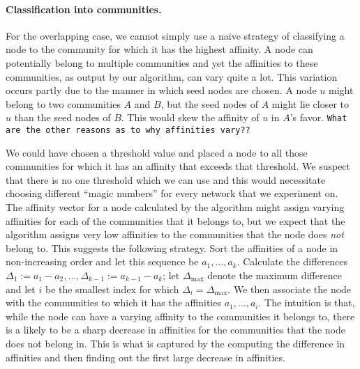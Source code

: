 \paragraph{Classification into communities.} For the overlapping case, we cannot
simply use a naive strategy of classifying a node to the community for which it has 
the highest affinity. A node can potentially belong to multiple communities and yet 
the affinities to these communities, as output by our algorithm, can vary quite a lot. 
This variation occurs partly due to the manner in which seed nodes are chosen. A node $u$ might 
belong to two communities $A$ and $B$, but the seed nodes of $A$ might lie closer to $u$ than the 
seed nodes of $B$. This would skew the affinity of $u$ in $A$'s favor. \texttt{What are the other reasons 
as to why affinities vary??}

We could have chosen a threshold value and placed a node to all those communities for which 
it has an affinity that exceeds that threshold. We suspect that there is no one threshold 
which we can use and this would necessitate choosing different ``magic numbers'' for every network 
that we experiment on. The affinity vector for a node calculated by the 
algorithm might assign varying affinities for each of the communities that it belongs to, but we expect 
that the algorithm assigns very low affinities to the communities that the node does \emph{not} belong to. 
This suggests the following strategy. Sort the affinities of a node in non-increasing order and let this 
sequence be $a_1, \ldots, a_k$. Calculate the differences $\Delta_{1} := a_1 - a_2, \ldots, 
\Delta_{k-1} := a_{k - 1} - a_k$; let $\Delta_{\mathrm{max}}$ denote the maximum difference 
and let $i$ be the smallest index for which $\Delta_i = \Delta_{\mathrm{max}}$. We then associate 
the node with the communities to which it has the affinities $a_1, \ldots, a_i$. 
The intuition is that, while the node can have a varying affinity to the communities it belongs to, 
there is a likely to be a sharp decrease in affinities for the communities that the node does 
not belong in. This is what is captured by the computing the difference in affinities and then finding 
out the first large decrease in affinities.

